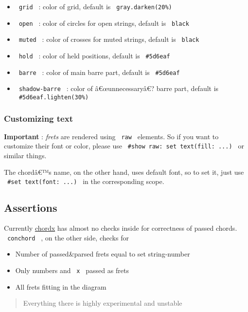 \begin{itemize}
\tightlist
\item
  \texttt{\ grid\ } : color of grid, default is
  \texttt{\ gray.darken(20\%)\ }
\item
  \texttt{\ open\ } : color of circles for open strings, default is
  \texttt{\ black\ }
\item
  \texttt{\ muted\ } : color of crosses for muted strings, default is
  \texttt{\ black\ }
\item
  \texttt{\ hold\ } : color of held positions, default is
  \texttt{\ \#5d6eaf\ }
\item
  \texttt{\ barre\ } : color of main barre part, default is
  \texttt{\ \#5d6eaf\ }
\item
  \texttt{\ shadow-barre\ } : color of â€œunnecessaryâ€? barre part,
  default is \texttt{\ \#5d6eaf.lighten(30\%)\ }
\end{itemize}

\subsubsection{Customizing text}\label{customizing-text}

\textbf{Important} : \emph{frets} are rendered using \texttt{\ raw\ }
elements. So if you want to customize their font or color, please use
\texttt{\ \#show\ raw:\ set\ text(fill:\ ...)\ } or similar things.

The chordâ€™s name, on the other hand, uses default font, so to set it,
just use \texttt{\ \#set\ text(font:\ ...)\ } in the corresponding
scope.

\subsection{Assertions}\label{assertions}

Currently \href{https://github.com/ljgago/typst-chords}{chordx} has
almost no checks inside for correctness of passed chords.
\texttt{\ conchord\ } , on the other side, checks for

\begin{itemize}
\tightlist
\item
  Number of passed\&parsed frets equal to set string-number
\item
  Only numbers and \texttt{\ x\ } passed as frets
\item
  All frets fitting in the diagram
\end{itemize}

\begin{quote}
Everything there is highly experimental and unstable
\end{quote}

